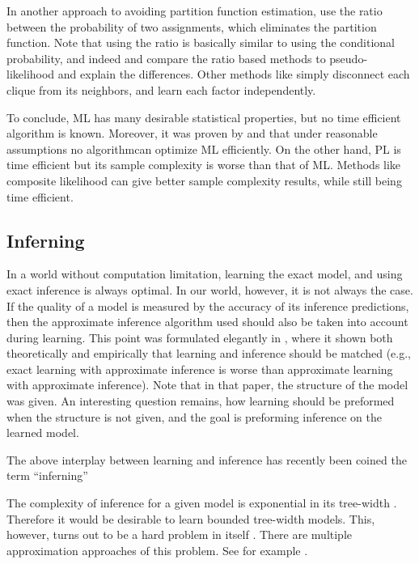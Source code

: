 In another approach to avoiding partition function estimation, \cite{hyvarinen2007some} use the ratio between the probability of two assignments, which eliminates the partition function. Note that using the ratio is basically similar to using the conditional probability, and indeed \cite{marlin2010inductive} and \cite{marlin2012asymptotic} compare the ratio based  methods to pseudo-likelihood and explain the differences. Other methods like \cite{mizrahi2014icml} simply disconnect each clique from its neighbors, and learn each factor independently.

To conclude, ML has many desirable statistical properties, but no time efficient algorithm is known. Moreover, it was proven by \cite{bresler2014hardness} and \cite{montanari2015computational} that under reasonable assumptions no algorithmcan optimize ML efficiently. On the other hand, PL is time efficient but its sample complexity is worse than that of ML. Methods like composite likelihood can give better sample complexity results, while still being time efficient.

\subsection{Inferning}
\label{sec:inferning}
In a world without computation limitation, learning the exact model,
and using exact inference is always optimal. In our world, however, it
is not always the case.  If the quality of a model is measured by the accuracy
of its inference predictions, then the approximate inference algorithm used
should also be taken into account during learning. This point was formulated
elegantly in \cite{wainwright2006estimating}, where it shown both theoretically and empirically that learning and inference should be matched (e.g., exact learning with approximate inference is worse than approximate learning with approximate inference). Note that in that paper, the structure of the model was given.  An interesting question remains, how learning should be preformed when
the structure is not given, and the goal is preforming inference on
the learned model.

The above interplay between learning and inference has recently been coined the term ``inferning''\cite{rohanimanesh2009training}

The complexity of inference for a given model is exponential in its tree-width \cite{robertson1983graph,robertson1994quickly}.
Therefore it would be desirable to learn bounded tree-width models.
This, however, turns out to be a hard problem in itself \cite{srebro2001maximum}. There are multiple approximation approaches of this problem. See for example \cite{karger2001learning,bach2001thin,elidan2009learning}.
%

